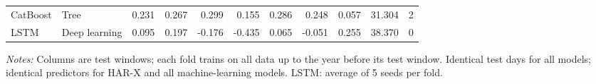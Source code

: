 \begin{table}[htbp]
{\begin{tabular}{llrrrrrrrrr}
CatBoost & Tree & 0.231 & 0.267 & 0.299 & 0.155 & 0.286 & 0.248 & 0.057 & 31.304 & 2 \\
LSTM & Deep learning & 0.095 & 0.197 & -0.176 & -0.435 & 0.065 & -0.051 & 0.255 & 38.370 & 0 \\
\bottomrule
\end{tabular}%
}
\par\vspace{2pt}\footnotesize\textit{Notes:} Columns are test windows; each fold trains on all data up to the year before its test window. Identical test days for all models; identical predictors for HAR-X and all machine-learning models. LSTM: average of 5 seeds per fold.
\end{table}

